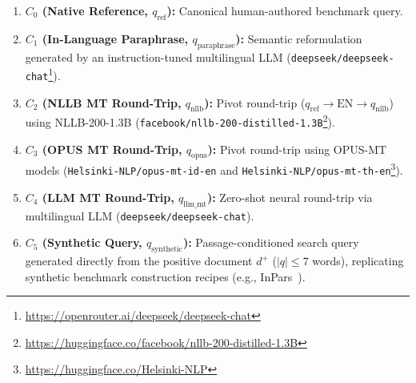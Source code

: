 \documentclass[runningheads]{llncs}
\begin{document}
\begin{enumerate}
    \item \textbf{$C_0$ (Native Reference, $q_{\text{ref}}$):} Canonical human-authored benchmark query.
    \item \textbf{$C_1$ (In-Language Paraphrase, $q_{\text{paraphrase}}$):} Semantic reformulation generated by an instruction-tuned multilingual LLM (\texttt{deepseek/deepseek-chat}\footnote{\url{https://openrouter.ai/deepseek/deepseek-chat}}).
    \item \textbf{$C_2$ (NLLB MT Round-Trip, $q_{\text{nllb}}$):} Pivot round-trip ($q_{\text{ref}} \rightarrow \text{EN} \rightarrow q_{\text{nllb}}$) using NLLB-200-1.3B (\texttt{facebook/nllb-200-distilled-1.3B}\footnote{\url{https://huggingface.co/facebook/nllb-200-distilled-1.3B}}).
    \item \textbf{$C_3$ (OPUS MT Round-Trip, $q_{\text{opus}}$):} Pivot round-trip using OPUS-MT models (\texttt{Helsinki-NLP/opus-mt-id-en} and \texttt{Helsinki-NLP/opus-mt-th-en}\footnote{\url{https://huggingface.co/Helsinki-NLP}}).
    \item \textbf{$C_4$ (LLM MT Round-Trip, $q_{\text{llm\_mt}}$):} Zero-shot neural round-trip via multilingual LLM (\texttt{deepseek/deepseek-chat}).
    \item \textbf{$C_5$ (Synthetic Query, $q_{\text{synthetic}}$):} Passage-conditioned search query generated directly from the positive document $d^+$ ($|q| \le 7$ words), replicating synthetic benchmark construction recipes (e.g., InPars~\cite{bonifacio2022inpars}).
\end{enumerate}
\end{document}
